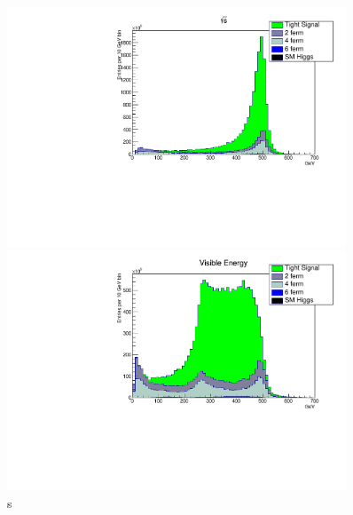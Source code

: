 \begin{figure}
 \centering
    \begin{minipage}{0.49\textwidth}
        \centering
        \includegraphics[width=0.9\textwidth]{EcomHist.pdf} %
        
    \end{minipage}\hfill
    \begin{minipage}{0.49\textwidth}
        \centering
        \includegraphics[width=0.9\textwidth]{EvisHist.pdf} %
        
     \end{minipage}
     \caption{s}
\end{figure}


